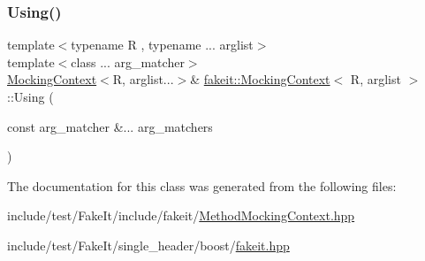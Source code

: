 \subsubsection{\texorpdfstring{Using()}{Using()}\hspace{0.1cm}{\footnotesize\ttfamily [18/18]}}
{\footnotesize\ttfamily template$<$typename R , typename ... arglist$>$ \\
template$<$class ... arg\+\_\+matcher$>$ \\
\mbox{\hyperlink{classfakeit_1_1MockingContext}{Mocking\+Context}}$<$R, arglist...$>$\& \mbox{\hyperlink{classfakeit_1_1MockingContext}{fakeit\+::\+Mocking\+Context}}$<$ R, arglist $>$\+::Using (\begin{DoxyParamCaption}\item[{const arg\+\_\+matcher \&...}]{arg\+\_\+matchers }\end{DoxyParamCaption})\hspace{0.3cm}{\ttfamily [inline]}}



The documentation for this class was generated from the following files\+:\begin{DoxyCompactItemize}
\item 
include/test/\+Fake\+It/include/fakeit/\mbox{\hyperlink{MethodMockingContext_8hpp}{Method\+Mocking\+Context.\+hpp}}\item 
include/test/\+Fake\+It/single\+\_\+header/boost/\mbox{\hyperlink{single__header_2boost_2fakeit_8hpp}{fakeit.\+hpp}}\end{DoxyCompactItemize}
